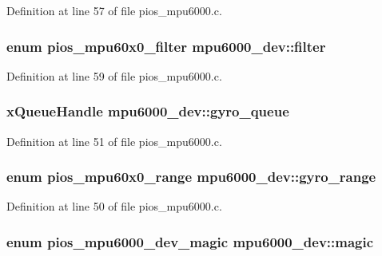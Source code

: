 \-Definition at line 57 of file pios\-\_\-mpu6000.\-c.

\hypertarget{structmpu6000__dev_ad8507301bf86feb8f18211ddb353f332}{
\subsubsection[{filter}]{\setlength{\rightskip}{0pt plus 5cm}enum {\bf pios\-\_\-mpu60x0\-\_\-filter} {\bf mpu6000\-\_\-dev\-::filter}}}\label{structmpu6000__dev_ad8507301bf86feb8f18211ddb353f332}


\-Definition at line 59 of file pios\-\_\-mpu6000.\-c.

\hypertarget{structmpu6000__dev_a356a86d4ad42dd2daecb5e255cc5f7ce}{
\subsubsection[{gyro\-\_\-queue}]{\setlength{\rightskip}{0pt plus 5cm}x\-Queue\-Handle {\bf mpu6000\-\_\-dev\-::gyro\-\_\-queue}}}\label{structmpu6000__dev_a356a86d4ad42dd2daecb5e255cc5f7ce}


\-Definition at line 51 of file pios\-\_\-mpu6000.\-c.

\hypertarget{structmpu6000__dev_a0d330b8cdca1d01d4b5eecd21bba78f6}{
\subsubsection[{gyro\-\_\-range}]{\setlength{\rightskip}{0pt plus 5cm}enum {\bf pios\-\_\-mpu60x0\-\_\-range} {\bf mpu6000\-\_\-dev\-::gyro\-\_\-range}}}\label{structmpu6000__dev_a0d330b8cdca1d01d4b5eecd21bba78f6}


\-Definition at line 50 of file pios\-\_\-mpu6000.\-c.

\hypertarget{structmpu6000__dev_a11582fec1335a7b8e45979545ce7191b}{
\subsubsection[{magic}]{\setlength{\rightskip}{0pt plus 5cm}enum {\bf pios\-\_\-mpu6000\-\_\-dev\-\_\-magic} {\bf mpu6000\-\_\-dev\-::magic}}}\label{structmpu6000__dev_a11582fec1335a7b8e45979545ce7191b}


